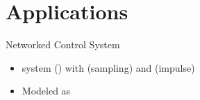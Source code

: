 \section{Applications}


\begin{frame}{Networked Control System}
%
\begin{itemize}
\item {} system () with
 (sampling) and  (impulse)
\item Modeled as 
\end{itemize}


\end{frame}
